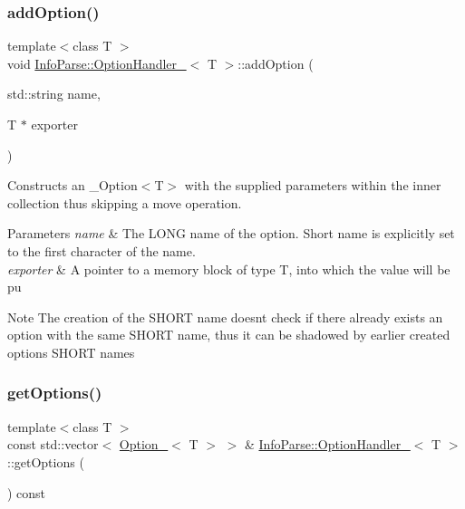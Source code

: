 \subsubsection{\texorpdfstring{addOption()}{addOption()}\hspace{0.1cm}{\footnotesize\ttfamily [3/3]}}
{\footnotesize\ttfamily template$<$class T $>$ \\
void \mbox{\hyperlink{class_info_parse_1_1_option_handler__}{Info\+Parse\+::\+Option\+Handler\+\_\+}}$<$ T $>$\+::add\+Option (\begin{DoxyParamCaption}
                                                                                                                                   \item[{std\+::string}]{name,  }\item[{T $\ast$}]{exporter }
\end{DoxyParamCaption})}



Constructs an \+\_\+\+Option$<$\+T$>$ with the supplied parameters within the inner collection thus skipping a move operation.


\begin{DoxyParams}{Parameters}
{\em name}
    & The L\+O\+NG name of the option. Short name is explicitly set to the first character of the name. \\
    \hline
    {\em exporter} & A pointer to a memory block of type T, into which the value will be pu\\
    \hline
\end{DoxyParams}
\begin{DoxyNote}{Note}
    The creation of the S\+H\+O\+RT name doesn\textquotesingle{}t check if there already exists an option with the same S\+H\+O\+RT name, thus it can be shadowed by earlier created options\textquotesingle{} S\+H\+O\+RT names
\end{DoxyNote}
\mbox{\label{class_info_parse_1_1_option_handler___aaa1be80887897051eb5dbad952e97d3a}}
\subsubsection{\texorpdfstring{getOptions()}{getOptions()}}
{\footnotesize\ttfamily template$<$class T $>$ \\
const std\+::vector$<$ \mbox{\hyperlink{class_info_parse_1_1_option__}{Option\+\_\+}}$<$ T $>$ $>$ \& \mbox{\hyperlink{class_info_parse_1_1_option_handler__}{Info\+Parse\+::\+Option\+Handler\+\_\+}}$<$ T $>$\+::get\+Options (\begin{DoxyParamCaption}{ }\end{DoxyParamCaption}) const}



